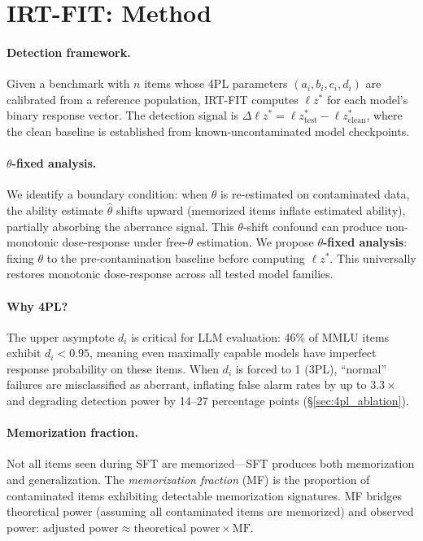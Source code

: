 \documentclass[11pt,a4paper]{article}
\begin{document}
\section{IRT-FIT: Method}
\label{sec:method}

\paragraph{Detection framework.}
Given a benchmark with $n$ items whose 4PL parameters $(a_i, b_i, c_i, d_i)$ are calibrated from a reference population, IRT-FIT computes $\ell z^*$ for each model's binary response vector.
The detection signal is $\Delta \ell z^* = \ell z^*_{\text{test}} - \ell z^*_{\text{clean}}$, where the clean baseline is established from known-uncontaminated model checkpoints.

\paragraph{$\theta$-fixed analysis.}
We identify a boundary condition: when $\theta$ is re-estimated on contaminated data, the ability estimate $\hat{\theta}$ shifts upward (memorized items inflate estimated ability), partially absorbing the aberrance signal.
This $\theta$-shift confound can produce non-monotonic dose-response under free-$\theta$ estimation.
We propose \textbf{$\theta$-fixed analysis}: fixing $\theta$ to the pre-contamination baseline before computing $\ell z^*$.
This universally restores monotonic dose-response across all tested model families.

\paragraph{Why 4PL?}
The upper asymptote $d_i$ is critical for LLM evaluation: 46\% of MMLU items exhibit $d_i < 0.95$, meaning even maximally capable models have imperfect response probability on these items.
When $d_i$ is forced to 1 (3PL), ``normal'' failures are misclassified as aberrant, inflating false alarm rates by up to $3.3\times$ and degrading detection power by 14--27 percentage points (\S\ref{sec:4pl_ablation}).

\paragraph{Memorization fraction.}
Not all items seen during SFT are memorized---SFT produces both memorization and generalization.
The \emph{memorization fraction} (MF) is the proportion of contaminated items exhibiting detectable memorization signatures.
MF bridges theoretical power (assuming all contaminated items are memorized) and observed power: $\text{adjusted power} \approx \text{theoretical power} \times \text{MF}$.
\end{document}
